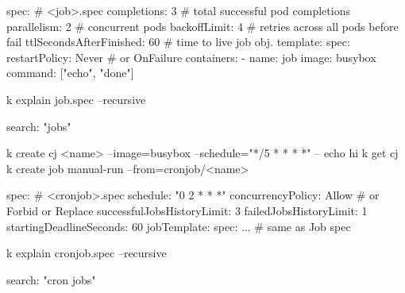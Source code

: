 

\begin{cheatcodebash}
spec:                   # <job>.spec
  completions: 3        # total successful pod completions
  parallelism: 2        # concurrent pods
  backoffLimit: 4       # retries across all pods before fail
  ttlSecondsAfterFinished: 60 # time to live job obj.
  template:
    spec:
      restartPolicy: Never  # or OnFailure
      containers:
      - name: job
        image: busybox
        command: ["echo", "done"]
\end{cheatcodebash}

\begin{cheatcodebash}
k explain job.spec --recursive
\end{cheatcodebash}

\begin{cheatcodebash}
search: "jobs"
\end{cheatcodebash}


\begin{cheatcodebash}
k create cj <name> --image=busybox --schedule="*/5 * * * *" -- echo hi %
k get cj
k create job manual-run --from=cronjob/<name>
\end{cheatcodebash}

\begin{cheatcodebash}
spec:                       # <cronjob>.spec
  schedule: "0 2 * * *"
  concurrencyPolicy: Allow  # or Forbid or Replace
  successfulJobsHistoryLimit: 3
  failedJobsHistoryLimit: 1
  startingDeadlineSeconds: 60
  jobTemplate:
    spec: ...               # same as Job spec
\end{cheatcodebash}

\begin{cheatcodebash}
k explain cronjob.spec --recursive
\end{cheatcodebash}

\begin{cheatcodebash}
search: "cron jobs"
\end{cheatcodebash}


